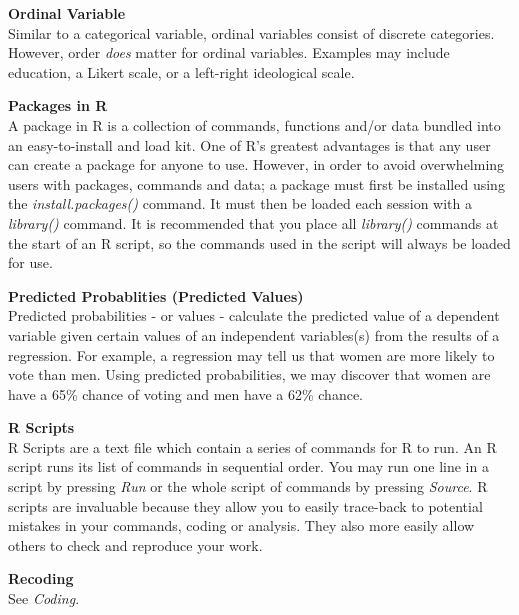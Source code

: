 \documentclass[12pt,letterpaper]{article}
\begin{document}
\textbf{Ordinal Variable}\\
Similar to a categorical variable, ordinal variables consist of discrete categories. However, order \textit{does} matter for ordinal variables. Examples may include education, a Likert scale, or a left-right ideological scale.

\vspace{1em}

\textbf{Packages in R}\\
A package in R is a collection of commands, functions and/or data bundled into an easy-to-install and load kit. One of R's greatest advantages is that any user can create a package for anyone to use. However, in order to avoid overwhelming users with packages, commands and data; a package must first be installed using the \textit{install.packages()} command. It must then be loaded each session with a \textit{library()} command. It is recommended that you place all \textit{library()} commands at the start of an R script, so the commands used in the script will always be loaded for use. 

\vspace{1em}

\textbf{Predicted Probablities (Predicted Values)}\\
Predicted probabilities - or values - calculate the predicted value of a dependent variable given certain values of an independent variables(s) from the results of a regression. For example, a regression may tell us that women are more likely to vote than men. Using predicted probabilities, we may discover that women are have a 65\% chance of voting and men have a 62\% chance. 

\vspace{1em}


\textbf{R Scripts}\\
R Scripts are a text file which contain a series of commands for R to run. An R script runs its list of commands in sequential order. You may run one line in a script by pressing \textit{Run} or the whole script of commands by pressing \textit{Source}. R scripts are invaluable because they allow you to easily trace-back to potential mistakes in your commands, coding or analysis. They also more easily allow others to check and reproduce your work.

\vspace{1em}


\textbf{Recoding}\\
See \textit{Coding}.
\vspace{1em}
\end{document}
